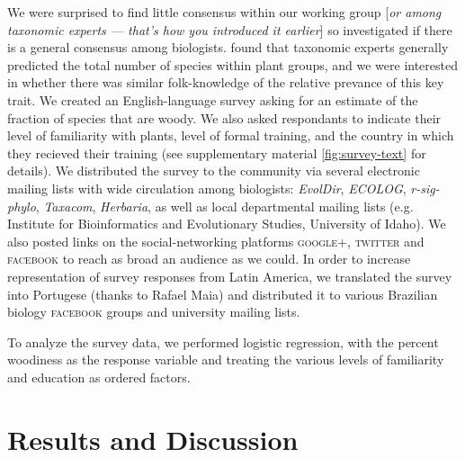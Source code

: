 \documentclass[12pt]{article}
\begin{document}
We were surprised to find little consensus within our working group
[\textit{or among taxonomic experts --- that's how you introduced it
  earlier}] so investigated if there is a general consensus among
biologists.
% 
\citet{joppa2010} found that taxonomic experts generally predicted the
total number of species within plant groups, and we were interested in
whether there was similar folk-knowledge of the relative prevance of
this key trait.
%
We created an English-language survey asking for an estimate of the
fraction of species that are woody.  We also asked respondants to
indicate their level of familiarity with plants, level of formal
training, and the country in which they recieved their training (see
supplementary material \ref{fig:survey-text} for details).
We distributed the survey to the community via several electronic
mailing lists with wide circulation among biologists: \emph{EvolDir},
\emph{ECOLOG}, \emph{r-sig-phylo}, \emph{Taxacom}, \emph{Herbaria}, as
well as local departmental mailing lists (e.g. Institute for
Bioinformatics and Evolutionary Studies, University of Idaho). We also
posted links on the social-networking platforms \textsc{google+},
\textsc{twitter} and \textsc{facebook} to reach as broad an audience
as we could.
In order to increase representation of survey responses from Latin
America, we translated the survey into Portugese (thanks to Rafael
Maia) and distributed it to various Brazilian biology
\textsc{facebook} groups and university mailing lists.

To analyze the survey data, we performed logistic regression, with the percent woodiness as the response variable \citep[for discussion as to why we used logistic regression, see][]{wartonarcsine} and treating the various levels of familiarity and education as ordered factors.


\section{Results and Discussion}
\end{document}
